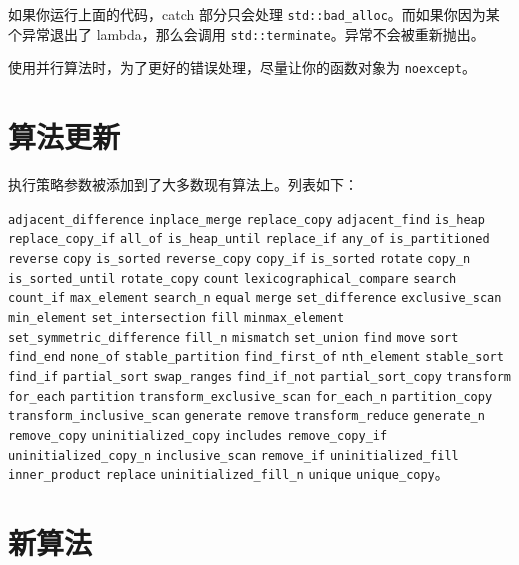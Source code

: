 如果你运行上面的代码，catch 部分只会处理 \texttt{std::bad\_alloc}。而如果你因为某个异常退出了 lambda，那么会调用 \texttt{std::terminate}。异常不会被重新抛出。

\begin{myInfoBox}
使用并行算法时，为了更好的错误处理，尽量让你的函数对象为 \texttt{noexcept}。
\end{myInfoBox}


\section{算法更新}

执行策略参数被添加到了大多数现有算法上。列表如下：

\texttt{adjacent\_difference} \texttt{inplace\_merge} \texttt{replace\_copy} \texttt{adjacent\_find} \texttt{is\_heap} \texttt{replace\_copy\_if} \texttt{all\_of} \texttt{is\_heap\_until} \texttt{replace\_if} \texttt{any\_of} \texttt{is\_partitioned} \texttt{reverse} \texttt{copy} \texttt{is\_sorted} \texttt{reverse\_copy} \texttt{copy\_if} \texttt{is\_sorted} \texttt{rotate} \texttt{copy\_n} \texttt{is\_sorted\_until} \texttt{rotate\_copy} \texttt{count} \texttt{lexicographical\_compare} \texttt{search} \texttt{count\_if} \texttt{max\_element} \texttt{search\_n} \texttt{equal} \texttt{merge} \texttt{set\_difference} \texttt{exclusive\_scan} \texttt{min\_element} \texttt{set\_intersection} \texttt{fill} \texttt{minmax\_element} \texttt{set\_symmetric\_difference} \texttt{fill\_n} \texttt{mismatch} \texttt{set\_union} \texttt{find} \texttt{move} \texttt{sort} \texttt{find\_end} \texttt{none\_of} \texttt{stable\_partition} \texttt{find\_first\_of} \texttt{nth\_element} \texttt{stable\_sort} \texttt{find\_if} \texttt{partial\_sort} \texttt{swap\_ranges} \texttt{find\_if\_not} \texttt{partial\_sort\_copy} \texttt{transform} \texttt{for\_each} \texttt{partition} \texttt{transform\_exclusive\_scan} \texttt{for\_each\_n} \texttt{partition\_copy} \texttt{transform\_inclusive\_scan} \texttt{generate} \texttt{remove} \texttt{transform\_reduce} \texttt{generate\_n} \texttt{remove\_copy} \texttt{uninitialized\_copy} \texttt{includes} \texttt{remove\_copy\_if} \texttt{uninitialized\_copy\_n} \texttt{inclusive\_scan} \texttt{remove\_if} \texttt{uninitialized\_fill} \texttt{inner\_product} \texttt{replace} \texttt{uninitialized\_fill\_n} \texttt{unique} \texttt{unique\_copy}。


\section{新算法}

